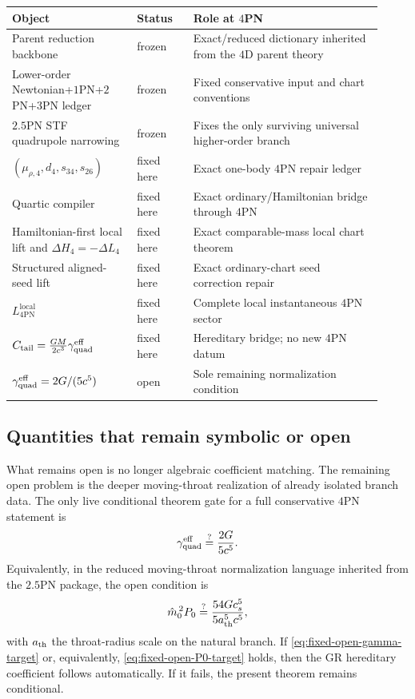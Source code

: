 \documentclass[11pt]{article}
\begin{document}
\begin{center}
\renewcommand{\arraystretch}{1.15}
\begin{tabular}{@{}>{\raggedright\arraybackslash}p{0.31\linewidth}>{\raggedright\arraybackslash}p{0.14\linewidth}>{\raggedright\arraybackslash}p{0.47\linewidth}@{}}
\textbf{Object} & \textbf{Status} & \textbf{Role at $4$PN} \\
\hline
Parent reduction backbone & frozen & Exact/reduced dictionary inherited from the $4$D parent theory \\
Lower-order Newtonian+$1$PN+$2$PN+$3$PN ledger & frozen & Fixed conservative input and chart conventions \\
$2.5$PN STF quadrupole narrowing & frozen & Fixes the only surviving universal higher-order branch \\
$(\mu_{\rho,4},d_4,s_{34},s_{26})$ & fixed here & Exact one-body $4$PN repair ledger \\
Quartic compiler & fixed here & Exact ordinary/Hamiltonian bridge through $4$PN \\
Hamiltonian-first local lift and \(\Delta H_4=-\Delta L_4\) & fixed here & Exact comparable-mass local chart theorem \\
Structured aligned-seed lift & fixed here & Exact ordinary-chart seed correction repair \\
$L_{4\mathrm{PN}}^{\mathrm{local}}$ & fixed here & Complete local instantaneous $4$PN sector \\
$C_{\rm tail}=\tfrac{GM}{2c^3}\gamma_{\rm quad}^{\rm eff}$ & fixed here & Hereditary bridge; no new $4$PN datum \\
\(\gamma_{\rm quad}^{\rm eff}=2G/(5c^5)\) & open & Sole remaining normalization condition \\
\end{tabular}
\end{center}

\subsection{Quantities that remain symbolic or open}
\label{sec:fixed-open-still-open}

What remains open is no longer algebraic coefficient matching.  The remaining
open problem is the deeper moving-throat realization of already isolated branch
data.  The only live conditional theorem gate for a full conservative $4$PN
statement is
\begin{equation}
\gamma_{\rm quad}^{\rm eff}\stackrel{?}{=}\frac{2G}{5c^5}.
\label{eq:fixed-open-gamma-target}
\end{equation}
Equivalently, in the reduced moving-throat normalization language inherited from
the $2.5$PN package, the open condition is
\begin{equation}
\hat m_0^{\,2}P_0
\stackrel{?}{=}
\frac{54Gc_s^5}{5a_{\rm th}^5c^5},
\label{eq:fixed-open-P0-target}
\end{equation}
with $a_{\rm th}$ the throat-radius scale on the natural branch.  If
\eqref{eq:fixed-open-gamma-target} or, equivalently,
\eqref{eq:fixed-open-P0-target} holds, then the GR hereditary coefficient
follows automatically.  If it fails, the present theorem remains conditional.
\end{document}
